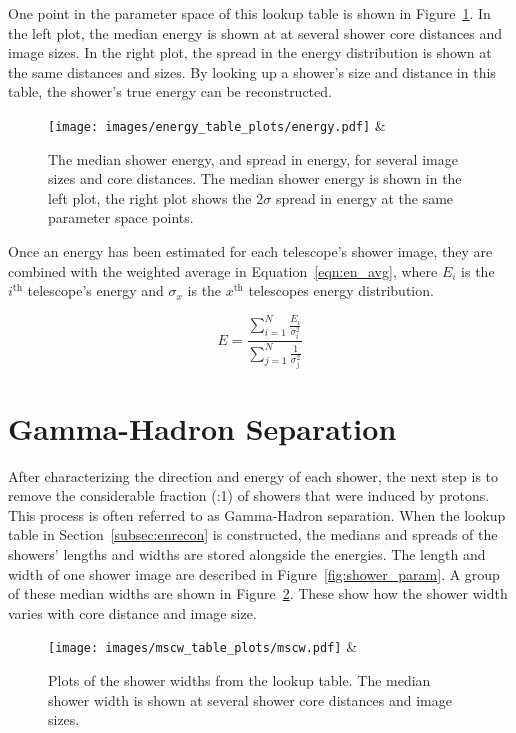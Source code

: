 One point in the parameter space of this lookup table is shown in Figure~\ref{fig:energy_params}.
In the left plot, the median energy is shown at at several shower core distances and image sizes.
In the right plot, the spread in the energy distribution is shown at the same distances and sizes.
By looking up a shower's size and distance in this table, the shower's true energy can be reconstructed.

\begin{figure}[bh]
  \centering
  \texttt{[image: images/energy\_table\_plots/energy.pdf]} &
  \caption[Energy Table Parameters]{
    The median shower energy, and spread in energy, for several image sizes and core distances.
    The median shower energy is shown in the left plot, the right plot shows the $2\sigma$ spread in energy at the same parameter space points.
  }
  \label{fig:energy_params}
\end{figure}

Once an energy has been estimated for each telescope's shower image, they are combined with the weighted average in Equation~\ref{eqn:en_avg}, where $E_i$ is the $i^{\textrm{th}}$ telescope's energy and $\sigma_x$ is the $x^{\textrm{th}}$ telescopes energy distribution.

\begin{equation}\label{eqn:en_avg}
  E = \frac{ \sum_{i=1}^{N} \frac{E_i}{ \sigma_{i}^2} }{ \sum_{j=1}^N \frac{1}{ \sigma_{j}^2 } }
\end{equation}


\section{Gamma-Hadron Separation}

After characterizing the direction and energy of each shower, the next step is to remove the considerable fraction (:1) of showers that were induced by protons.
This process is often referred to as Gamma-Hadron separation.
When the lookup table in Section~\ref{subsec:enrecon} is constructed, the medians and spreads of the showers' lengths and widths are stored alongside the energies.
The length and width of one shower image are described in Figure~\ref{fig:shower_param}.
A group of these median widths are shown in Figure~\ref{fig:mscw_params}.
These show how the shower width varies with core distance and image size.

\begin{figure}[b]
  \centering
  \texttt{[image: images/mscw\_table\_plots/mscw.pdf]} &
  \caption[Shower Median Width]{
    Plots of the shower widths from the lookup table.
    The median shower width is shown at several shower core distances and image sizes.
  }
  \label{fig:mscw_params}
\end{figure}

